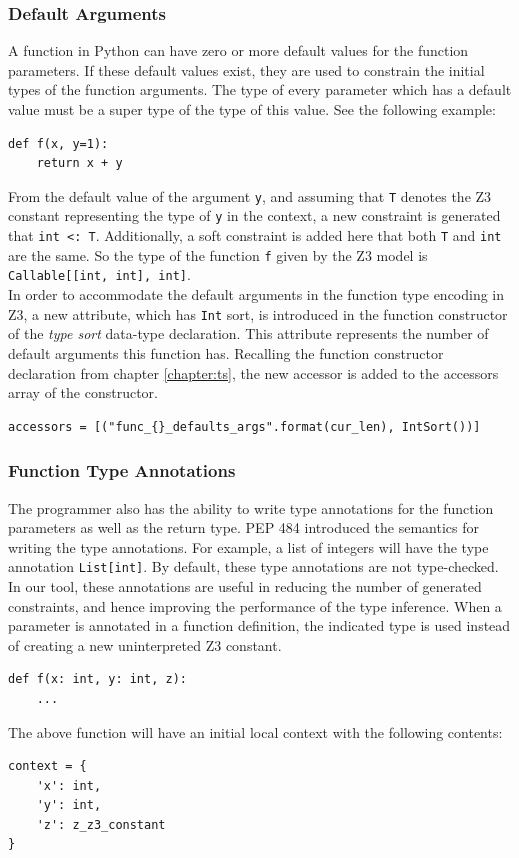 \subsubsection{Default Arguments}
A function in Python can have zero or more default values for the function parameters. If these default values exist, they are used to constrain the initial types of the function arguments. The type of every parameter which has a default value must be a super type of the type of this value. See the following example:

\begin{lstlisting}
def f(x, y=1):
	return x + y
\end{lstlisting}

From the default value of the argument \lstinline|y|, and assuming that \lstinline|T| denotes the Z3 constant representing the type of \lstinline|y| in the context, a new constraint is generated that \lstinline|int <: T|. Additionally, a soft constraint is added here that both \lstinline|T| and \lstinline|int| are the same. So the type of the function \lstinline|f| given by the Z3 model is \lstinline|Callable[[int, int], int]|.\\

In order to accommodate the default arguments in the function type encoding in Z3, a new attribute, which has \lstinline|Int| sort, is introduced in the function constructor of the \textit{type sort} data-type declaration. This attribute represents the number of default arguments this function has. Recalling the function constructor declaration from chapter \ref{chapter:ts}, the new accessor is added to the accessors array of the constructor.
\begin{lstlisting}
accessors = [("func_{}_defaults_args".format(cur_len), IntSort())]
\end{lstlisting}

\subsubsection{Function Type Annotations}
The programmer also has the ability to write type annotations for the function parameters as well as the return type. PEP 484 \cite{484} introduced the semantics for writing the type annotations. For example, a list of integers will have the type annotation \lstinline|List[int]|. By default, these type annotations are not type-checked. In our tool, these annotations are useful in reducing the number of generated constraints, and hence improving the performance of the type inference. When a parameter is annotated in a function definition, the indicated type is used instead of creating a new uninterpreted Z3 constant.
\begin{lstlisting}
def f(x: int, y: int, z):
	...
\end{lstlisting}
The above function will have an initial local context with the following contents:
\begin{lstlisting}
context = {
	'x': int,
	'y': int,
	'z': z_z3_constant
}
\end{lstlisting}

